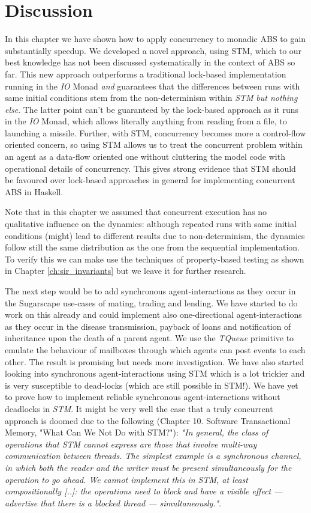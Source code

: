 \section{Discussion}
In this chapter we have shown how to apply concurrency to monadic ABS to gain substantially speedup. We developed a novel approach, using STM, which to our best knowledge has not been discussed systematically in the context of ABS so far. This new approach outperforms a traditional lock-based implementation running in the \textit{IO} Monad \textit{and} guarantees that the differences between runs with same initial conditions stem from the non-determinism within \textit{STM} \textit{but nothing else}. The latter point can't be guaranteed by the lock-based approach as it runs in the \textit{IO} Monad, which allows literally anything from reading from a file, to launching a missile. Further, with STM, concurrency becomes more a control-flow oriented concern, so using STM allows us to treat the concurrent problem within an agent as a data-flow oriented one without cluttering the model code with operational details of concurrency. This gives strong evidence that STM should be favoured over lock-based approaches in general for implementing concurrent ABS in Haskell.

Note that in this chapter we assumed that concurrent execution has no qualitative influence on the dynamics: although repeated runs with same initial conditions (might) lead to different results due to non-determinism, the dynamics follow still the same distribution as the one from the sequential implementation. To verify this we can make use the techniques of property-based testing as shown in Chapter \ref{ch:sir_invariants} but we leave it for further research.

The next step would be to add synchronous agent-interactions as they occur in the Sugarscape use-cases of mating, trading and lending. We have started to do work on this already and could implement also one-directional agent-interactions as they occur in the disease transmission, payback of loans and notification of inheritance upon the death of a parent agent. We use the \textit{TQueue} primitive to emulate the behaviour of mailboxes through which agents can post events to each other. The result is promising but needs more investigation. We have also started looking into synchronous agent-interactions using STM which is a lot trickier and is very susceptible to dead-locks (which are still possible in STM!). We have yet to prove how to implement reliable synchronous agent-interactions without deadlocks in \textit{STM}. It might be very well the case that a truly concurrent approach is doomed due to the following \cite{marlow_parallel_2013} (Chapter 10. Software Transactional Memory, "What Can We Not Do with STM?"): \textit{"In general, the class of operations that STM cannot express are those that involve multi-way communication between threads. The simplest example is a synchronous channel, in which both the reader and the writer must be present simultaneously for the operation to go ahead. We cannot implement this in STM, at least compositionally [..]: the operations need to block and have a visible effect — advertise that there is a blocked thread — simultaneously."}. 

